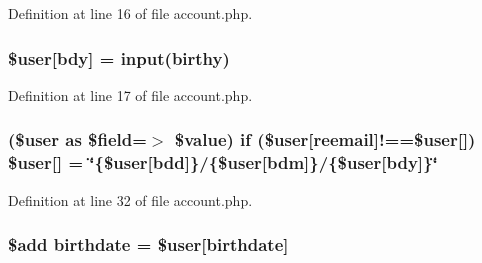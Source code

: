Definition at line 16 of file account.\+php.

\subsubsection[{\texorpdfstring{\$user}{$user}}]{\setlength{\rightskip}{0pt plus 5cm}\${\bf user}\mbox{[}\textquotesingle{}bdy\textquotesingle{}\mbox{]} = {\bf input}(\textquotesingle{}birthy\textquotesingle{})}\hypertarget{actions_2account_8php_a92cb1e1829b4b30d3823bdf025e17a03}{}\label{actions_2account_8php_a92cb1e1829b4b30d3823bdf025e17a03}


Definition at line 17 of file account.\+php.

\subsubsection[{\texorpdfstring{\$user}{$user}}]{ (\${\bf user} as \$field=$>$ \${\bf value}) {\bf if} (\${\bf user}\mbox{[}\textquotesingle{}reemail\textquotesingle{}\mbox{]}!==\${\bf user}\mbox{[}\textquotesingle{}\mbox{]}) \${\bf user}\mbox{[}\textquotesingle{}\mbox{]} = \char`\"{}\{\$user\mbox{[}\textquotesingle{}bdd\textquotesingle{}\mbox{]}\}/\{\${\bf user}\mbox{[}\textquotesingle{}bdm\textquotesingle{}\mbox{]}\}/\{\${\bf user}\mbox{[}\textquotesingle{}bdy\textquotesingle{}\mbox{]}\}\char`\"{}}\hypertarget{actions_2account_8php_a2862e61a0af8842af31bb09415bc6086}{}\label{actions_2account_8php_a2862e61a0af8842af31bb09415bc6086}


Definition at line 32 of file account.\+php.

\subsubsection[{\texorpdfstring{birthdate}{birthdate}}]{\setlength{\rightskip}{0pt plus 5cm}\${\bf add} birthdate = \${\bf user}\mbox{[}\textquotesingle{}birthdate\textquotesingle{}\mbox{]}}\hypertarget{actions_2account_8php_adcebf70992c7074e4bab2e0d5f831536}{}\label{actions_2account_8php_adcebf70992c7074e4bab2e0d5f831536}


